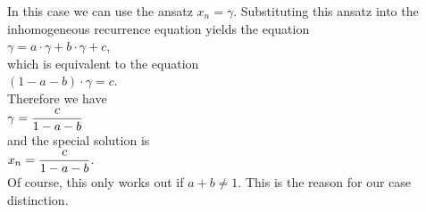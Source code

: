 \begin{enumerate}
\begin{enumerate}
            In this case we can use the ansatz $x_n = \gamma$.  Substituting this ansatz into the
            inhomogeneous recurrence equation yields the equation
            \\[0.2cm]
            \hspace*{1.3cm}
            $\gamma = a \cdot \gamma + b \cdot \gamma + c$,
            \\[0.2cm]
            which is equivalent to the equation
            \\[0.2cm]
            \hspace*{1.3cm}
            $(1 - a - b) \cdot \gamma = c$.
            \\[0.2cm]
            Therefore we have
            \\[0.2cm]
            \hspace*{1.3cm}
            $\displaystyle \gamma = \frac{c}{1 - a - b}$
            \\[0.2cm]
            and the special solution is
            \\[0.2cm]
            \hspace*{1.3cm}
            $\displaystyle x_n = \frac{c}{1 - a - b}$.
            \\[0.2cm]
            Of course, this only works out if $a + b \not= 1$.  This is the reason for our case distinction.
            

\end{enumerate}
\end{enumerate}

